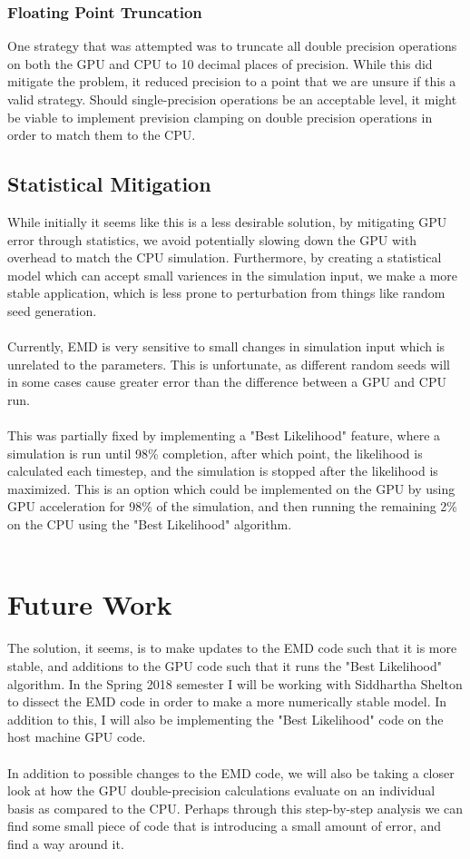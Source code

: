\documentclass[fleqn,10pt]{SelfArx} %
\begin{document}
        \subsubsection{Floating Point Truncation}
            One strategy that was attempted was to truncate all double precision operations on both the GPU and CPU to 10 decimal places of precision. While this did mitigate the problem, it reduced precision to a point that we are unsure if this a valid strategy. Should single-precision operations be an acceptable level, it might be viable to implement prevision clamping on double precision operations in order to match them to the CPU.

        \subsection{Statistical Mitigation}
            While initially it seems like this is a less desirable solution, by mitigating GPU error through statistics, we avoid potentially slowing down the GPU with overhead to match the CPU simulation. Furthermore, by creating a statistical model which can accept small variences in the simulation input, we make a more stable application, which is less prone to perturbation from things like random seed generation.\\~\\
            Currently, EMD is very sensitive to small changes in simulation input which is unrelated to the parameters. This is unfortunate, as different random seeds will in some cases cause greater error than the difference between a GPU and CPU run.\\~\\
            This was partially fixed by implementing a "Best Likelihood" feature, where a simulation is run until 98\% completion, after which point, the likelihood is calculated each timestep, and the simulation is stopped after the likelihood is maximized. This is an option which could be implemented on the GPU by using GPU acceleration for 98\% of the simulation, and then running the remaining 2\% on the CPU using the "Best Likelihood" algorithm.\\~\\

\section{Future Work}
The solution, it seems, is to make updates to the EMD code such that it is more stable, and additions to the GPU code such that it runs the "Best Likelihood" algorithm. In the Spring 2018 semester I will be working with Siddhartha Shelton to dissect the EMD code in order to make a more numerically stable model. In addition to this, I will also be implementing the "Best Likelihood" code on the host machine GPU code.\\~\\
In addition to possible changes to the EMD code, we will also be taking a closer look at how the GPU double-precision calculations evaluate on an individual basis as compared to the CPU. Perhaps through this step-by-step analysis we can find some small piece of code that is introducing a small amount of error, and find a way around it.
\end{document}

